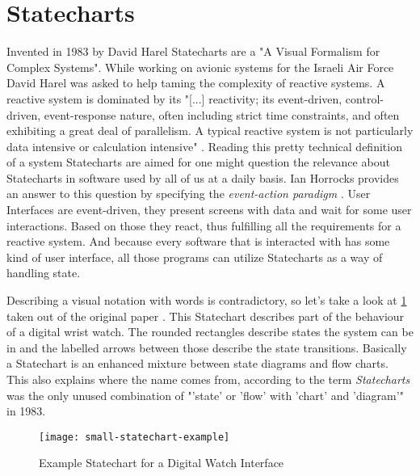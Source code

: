 \section{Statecharts}
\label{sec:statecharts}
Invented in 1983 by David Harel Statecharts are a "A Visual Formalism for Complex Systems".
While working on avionic systems for the Israeli Air Force David Harel was asked to help taming the complexity of reactive systems.
A reactive system is dominated by its "[...] reactivity; its event-driven, control-driven, event-response nature, often including strict time constraints, and often exhibiting a great deal of parallelism. A typical reactive system is not particularly data intensive or calculation intensive" \autocite{harel_statecharts_2007}.
Reading this pretty technical definition of a system Statecharts are aimed for one might question the relevance about Statecharts in software used by all of us at a daily basis.
Ian Horrocks provides an answer to this question by specifying the \emph{event-action paradigm} \autocite{horrocks_constructing_1999}.
User Interfaces are event-driven, they present screens with data and wait for some user interactions.
Based on those they react, thus fulfilling all the requirements for a reactive system.
And because every software that is interacted with has some kind of user interface, all those programs can utilize Statecharts as a way of handling state.

Describing a visual notation with words is contradictory, so let's take a look at \ref{fig:statecharts-example} taken out of the original paper \textcite{harel_statecharts:_1987}.
This Statechart describes part of the behaviour of a digital wrist watch.
The rounded rectangles describe states the system can be in and the labelled arrows between those describe the state transitions.
Basically a Statechart is an enhanced mixture between state diagrams and flow charts.
This also explains where the name comes from, according to \citeauthor{harel_statecharts_2007} the term \emph{Statecharts} was the only unused combination of "'state' or 'flow' with 'chart' and 'diagram'" in 1983.

\begin{figure}[h]
\centering
\texttt{[image: small-statechart-example]}
\caption{Example Statechart for a Digital Watch Interface}
\label{fig:statecharts-example}
\end{figure}

